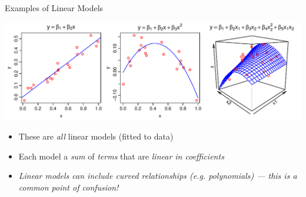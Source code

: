 \documentclass[xcolor=x11names,handout,compress]{beamer}
\renewcommand{\(}{\begin{columns}}
\renewcommand{\)}{\end{columns}}
\newcommand{\<}[1]{\begin{column}{#1}}
\renewcommand{\>}{\end{column}}
\begin{document}

\begin{frame}{Examples of Linear Models}

    \includegraphics[width=\textwidth]{Linear.pdf}
    
    \begin{itemize}\itemsep10pt
    \item These are {\it all} linear models (fitted to data)
    \item Each model a {\it sum} of {\it terms} that are {\it linear in coefficients}
    \item {\it Linear models can include curved relationships (e.g. polynomials) --- this is a common point of confusion!}
    \end{itemize}
    
    \end{frame}
    
\end{document}
